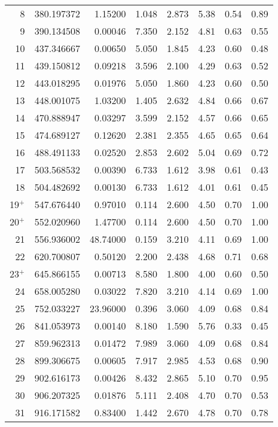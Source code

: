 \begin{longtable}{rrrrrrrr}
8      & 380.197372 & 1.15200 & 1.048 & 2.873 & 5.38 & 0.54 & 0.89 \\
9      & 390.134508 & 0.00046 & 7.350 & 2.152 & 4.81 & 0.63 & 0.55 \\
10     & 437.346667 & 0.00650 & 5.050 & 1.845 & 4.23 & 0.60 & 0.48 \\
11     & 439.150812 & 0.09218 & 3.596 & 2.100 & 4.29 & 0.63 & 0.52 \\
12     & 443.018295 & 0.01976 & 5.050 & 1.860 & 4.23 & 0.60 & 0.50 \\
13     & 448.001075 & 1.03200 & 1.405 & 2.632 & 4.84 & 0.66 & 0.67 \\
14     & 470.888947 & 0.03297 & 3.599 & 2.152 & 4.57 & 0.66 & 0.65 \\
15     & 474.689127 & 0.12620 & 2.381 & 2.355 & 4.65 & 0.65 & 0.64 \\
16     & 488.491133 & 0.02520 & 2.853 & 2.602 & 5.04 & 0.69 & 0.72 \\
17     & 503.568532 & 0.00390 & 6.733 & 1.612 & 3.98 & 0.61 & 0.43 \\
18     & 504.482692 & 0.00130 & 6.733 & 1.612 & 4.01 & 0.61 & 0.45 \\
19$^+$ & 547.676440 & 0.97010 & 0.114 & 2.600 & 4.50 & 0.70 & 1.00 \\
20$^+$ & 552.020960 & 1.47700 & 0.114 & 2.600 & 4.50 & 0.70 & 1.00 \\
21     & 556.936002 & 48.74000& 0.159 & 3.210 & 4.11 & 0.69 & 1.00 \\
22     & 620.700807 & 0.50120 & 2.200 & 2.438 & 4.68 & 0.71 & 0.68 \\
23$^+$ & 645.866155 & 0.00713 & 8.580 & 1.800 & 4.00 & 0.60 & 0.50 \\
24     & 658.005280 & 0.03022 & 7.820 & 3.210 & 4.14 & 0.69 & 1.00 \\
25     & 752.033227 & 23.96000& 0.396 & 3.060 & 4.09 & 0.68 & 0.84 \\
26     & 841.053973 & 0.00140 & 8.180 & 1.590 & 5.76 & 0.33 & 0.45 \\
27     & 859.962313 & 0.01472 & 7.989 & 3.060 & 4.09 & 0.68 & 0.84 \\
28     & 899.306675 & 0.00605 & 7.917 & 2.985 & 4.53 & 0.68 & 0.90 \\
29     & 902.616173 & 0.00426 & 8.432 & 2.865 & 5.10 & 0.70 & 0.95 \\
30     & 906.207325 & 0.01876 & 5.111 & 2.408 & 4.70 & 0.70 & 0.53 \\
31     & 916.171582 & 0.83400 & 1.442 & 2.670 & 4.78 & 0.70 & 0.78 \\

\end{longtable}
